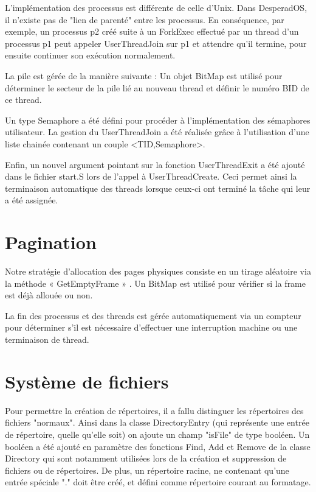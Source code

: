 \documentclass[12pt]{report}
\begin{document}
\bigskip

L'implémentation des processus est différente de celle d'Unix. Dans DesperadOS, il n'existe pas de "lien de parenté" entre les processus. En conséquence, par exemple, un processus p2 créé suite à un ForkExec effectué par un thread d'un processus p1 peut appeler UserThreadJoin sur p1 et attendre qu'il termine, pour ensuite continuer son exécution normalement.
\bigskip

La pile est gérée de la manière suivante :
Un objet BitMap est utilisé pour déterminer le secteur de la pile lié au nouveau thread et définir le numéro BID de ce thread.

Un type Semaphore a été défini pour procéder à l'implémentation des sémaphores utilisateur. 
La gestion du UserThreadJoin a été réalisée grâce à l'utilisation d'une liste chainée contenant un couple <TID,Semaphore>.

Enfin, un nouvel argument pointant sur la fonction UserThreadExit a été ajouté dans le fichier start.S lors de l'appel à UserThreadCreate. Ceci permet ainsi la terminaison automatique des threads lorsque ceux-ci ont terminé la tâche qui leur a été assignée.



\section{Pagination}


Notre stratégie d’allocation des pages physiques consiste en un tirage aléatoire via la méthode « GetEmptyFrame » . Un BitMap est utilisé pour vérifier si la frame est déjà allouée ou non.
\bigskip

La fin des processus et des threads est gérée automatiquement via un compteur pour déterminer s'il est nécessaire d'effectuer une interruption machine ou une terminaison de thread.
\bigskip

\section{Système de fichiers}

Pour permettre la création de répertoires, il a fallu distinguer les répertoires des fichiers "normaux". Ainsi dans la classe DirectoryEntry (qui représente une entrée de répertoire, quelle qu'elle soit) on ajoute un champ "isFile" de type booléen. Un booléen a été ajouté en paramètre des fonctions Find, Add et Remove de la classe Directory qui sont notamment utilisées lors de la création et suppression de fichiers ou de répertoires.
De plus, un répertoire racine, ne contenant qu'une entrée spéciale "." doit être créé, et défini comme répertoire courant au formatage.
\end{document}
